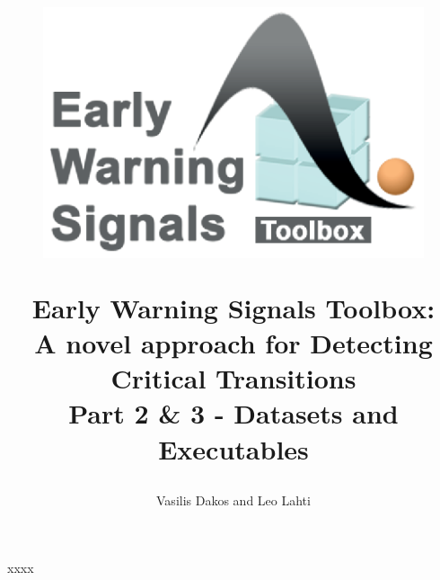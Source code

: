 \documentclass[12pt,a4paper,final]{article}
\author{Vasilis Dakos and Leo Lahti}
\title{
\begin{figure}[h]
\includegraphics[scale=0.55]{logoEWS.eps}
\end{figure}
Early Warning Signals Toolbox:\\ 
A novel approach for Detecting Critical Transitions\\
Part 2 \& 3 - Datasets and Executables
}
\begin{document}
\maketitle

\begin{doublespacing}

xxxx

\end{doublespacing}
\end{document}
